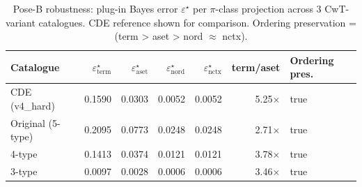 \begin{table}[htbp]
\centering\small
\caption{Pose-B robustness: plug-in Bayes error $\varepsilon^{\star}$ per $\pi$-class projection across 3 CwT-variant catalogues. CDE reference shown for comparison. Ordering preservation = (term > aset > nord $\approx$ nctx).}
\label{tab:phase1i_bayes_3variants}
\begin{tabular}{lrrrrrl}
\toprule
Catalogue & $\varepsilon^{\star}_{\text{term}}$ & $\varepsilon^{\star}_{\text{aset}}$ & $\varepsilon^{\star}_{\text{nord}}$ & $\varepsilon^{\star}_{\text{nctx}}$ & term/aset & Ordering pres. \\
\midrule
  CDE (v4\_hard) & 0.1590 & 0.0303 & 0.0052 & 0.0052 & 5.25$\times$ & true \\
  Original (5-type) & 0.2095 & 0.0773 & 0.0248 & 0.0248 & 2.71$\times$ & true \\
  4-type & 0.1413 & 0.0374 & 0.0121 & 0.0121 & 3.78$\times$ & true \\
  3-type & 0.0097 & 0.0028 & 0.0006 & 0.0006 & 3.46$\times$ & true \\
\bottomrule
\end{tabular}
\end{table}
